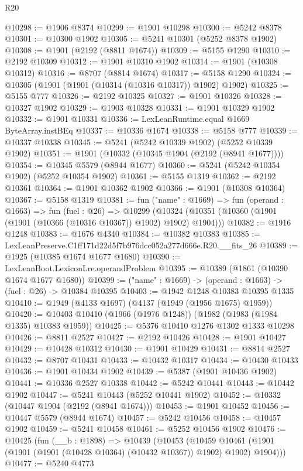 \begin{lexlean}{R20}
\begin{coremodule}
@10298 := @1906 @8374
@10299 := @1901 @10298
@10300 := @5242 @8378
@10301 := @10300 @1902
@10305 := @5241 @10301 (@5252 @8378 @1902)
@10308 := @1901 (@2192 (@8811 @1674))
@10309 := @5155 @1290
@10310 := @2192 @10309
@10312 := @1901 @10310 @1902
@10314 := @1901 (@10308 @10312)
@10316 := @8707 (@8814 @1674)
@10317 := @5158 @1290
@10324 := @10305 (@1901 (@1901 (@10314 (@10316 @10317)) @1902) @1902)
@10325 := @5155 @777
@10326 := @2192 @10325
@10327 := @1901 @10326
@10328 := @10327 @1902
@10329 := @1903 @10328
@10331 := @1901 @10329 @1902
@10332 := @1901 @10331
@10336 := LexLeanRuntime.equal @1669 ByteArray.instBEq
@10337 := @10336 @1674
@10338 := @5158 @777
@10339 := @10337 @10338
@10345 := @5241 (@5242 @10339 @1902) (@5252 @10339 @1902)
@10351 := @1901 (@10332 (@10345 @1904 (@2192 (@8941 @1677))))
@10354 := @10345 @5579 (@8944 @1677)
@10360 := @5241 (@5242 @10354 @1902) (@5252 @10354 @1902)
@10361 := @5155 @1319
@10362 := @2192 @10361
@10364 := @1901 @10362 @1902
@10366 := @1901 (@10308 @10364)
@10367 := @5158 @1319
@10381 := fun ("name" : @1669) =>
  fun (operand : @1663) =>
  fun (fuel : @26) =>
  @10299 (@10324 (@10351 (@10360 (@1901 (@1901 (@10366 (@10316 @10367)) @1902) @1902) @1904)))
@10382 := @1916 @1248
@10383 := @1676 @4340
@10384 := @10382 @10383
@10385 := LexLeanPreserve.C1ff171d22d5f7b976dcc052a277d666e.R20.__fits_26
@10389 := @1925 (@10385 @1674 @1677 @1680)
@10390 := LexLeanBoot.LexiconLre.operandProblem
@10395 := @10389 (@1861 (@10390 @1674 @1677 @1680))
@10399 := ("name" : @1669) -> (operand : @1663) -> (fuel : @26) -> @10384 @10395
@10403 := @1942 @1248 @10383 @10395 @1335
@10410 := @1949 (@4133 @1697) (@4137 (@1949 (@1956 @1675) @1959))
@10420 := @10403 @10410 (@1966 (@1976 @1248)) (@1982 (@1983 (@1984 @1335) @10383 @1959))
@10425 := @5376 @10410 @1276 @1302 @1333 @10298
@10426 := @8811 @2527
@10427 := @2192 @10426
@10428 := @1901 @10427
@10429 := @10428 @10312
@10430 := @1901 @10429
@10431 := @8814 @2527
@10432 := @8707 @10431
@10433 := @10432 @10317
@10434 := @10430 @10433
@10436 := @1901 @10434 @1902
@10439 := @5387 (@1901 @10436 @1902)
@10441 := @10336 @2527 @10338
@10442 := @5242 @10441
@10443 := @10442 @1902
@10447 := @5241 @10443 (@5252 @10441 @1902)
@10452 := @10332 (@10447 @1904 (@2192 (@8941 @1674)))
@10453 := @1901 @10452
@10456 := @10447 @5579 (@8944 @1674)
@10457 := @5242 @10456
@10458 := @10457 @1902
@10459 := @5241 @10458
@10461 := @5252 @10456 @1902
@10476 := @10425
    (fun (__b : @1898) =>
    @10439
      (@10453
        (@10459 @10461 (@1901 (@1901 (@1901 (@10428 @10364) (@10432 @10367)) @1902) @1902) @1904)))
@10477 := @5240 @4773

\end{coremodule}
\end{lexlean}
